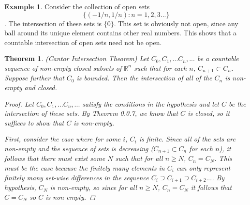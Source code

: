 \documentclass[11pt,a4paper]{report}
\theoremstyle{plain}
\newtheorem{thm}{Theorem}[section]
\theoremstyle{definition}
\newtheorem{exmp}{Example}[section]
\theoremstyle{remark}
\begin{document}
\begin{exmp}
Consider the collection of open sets $$\{(-1/n,1/n) : n = 1,2, 3...\}$$.  The intersection of these sets is $\{0\}$.  This set is obviously not open, since any ball around its unique element contains other real numbers. This shows that a countable intersection of open sets need not be open.
\end{exmp}
\begin{thm}{(Cantor Intersection Theorem)}
Let $C_0, C_1, ... C_n, ...$ be a countable sequence of non-empty closed subsets of $\mathbb{R}^n$ such that for each $n$, $C_{n+1} \subset C_n$.  Suppose further that $C_0$ is bounded. Then the intersection of all of the $C_n$ is non-empty and closed.
\begin{proof}
Let $C_0, C_1, ... C_n, ...$ satisfy the conditions in the hypothesis and let $C$ be the intersection of these sets. By Theorem 0.0.7, we know that $C$ is closed, so it suffices to show that $C$ is non-empty.

First, consider the case where for some $i$, $C_i$ is finite.  Since all of the sets are non-empty and the sequence of sets is decreasing ($C_{n+1} \subset C_n$ for each $n$), it follows that there must exist some $N$ such that for all $n \geq N$, $C_n = C_N$.  This must be the case because the finitely many elements in $C_i$ can only represent finitely many set-wise differences in the sequence $C_i \supseteq C_{i+1} \supseteq C_{i+2}...$.  By hypothesis, $C_N$ is non-empty, so since for all $n \geq N$, $C_n = C_N$ it follows that $C = C_N$ so $C$ is non-empty.


\end{proof}
\end{thm}
\end{document}
